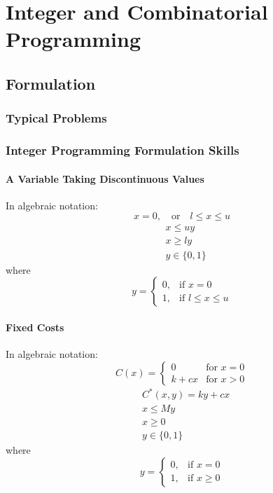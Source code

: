 \part{Integer and Combinatorial Programming}
	\chapter{Formulation}
		\section{Typical Problems}

		\section{Integer Programming Formulation Skills}
			\subsection{A Variable Taking Discontinuous Values}
				 In algebraic notation: 
				\begin{equation}
					x = 0,\quad \text{or} \quad l\le x \le u \nonumber
				\end{equation}
				\begin{align}
					& x \le uy\nonumber \\
					& x \ge ly \nonumber \\
					& y \in \{0, 1\} \nonumber
				\end{align}
				where
				\begin{equation}y=\begin{cases}0, & \text{if }x=0 \\ 1, & \text{if } l\le x \le u\end{cases}\nonumber \end{equation}
					
			\subsection{Fixed Costs}
				 In algebraic notation: 
				\begin{equation}
					C(x) = \begin{cases} 0 & \text{for } x=0 \\ k + cx & \text{for } x > 0 \end{cases} \nonumber
				\end{equation}
				\begin{align}
					& C^*(x, y) = ky+cx\nonumber\\
					& x \le My \nonumber \\
					& x \ge 0 \nonumber\\
					& y \in \{0, 1\} \nonumber
				\end{align}
				where
				\begin{equation}y=\begin{cases}0, & \text{if }x=0 \\ 1, & \text{if }x\ge 0\end{cases}\nonumber \end{equation}
			
